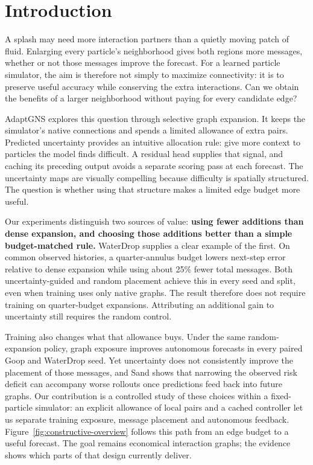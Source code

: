 \section{Introduction}
A splash may need more interaction partners than a quietly moving patch of fluid. Enlarging every particle's neighborhood gives both regions more messages, whether or not those messages improve the forecast. For a learned particle simulator\citep{sanchez2020}, the aim is therefore not simply to maximize connectivity: it is to preserve useful accuracy while conserving the extra interactions. Can we obtain the benefits of a larger neighborhood without paying for every candidate edge?

AdaptGNS explores this question through selective graph expansion. It keeps the simulator's native connections and spends a limited allowance of extra pairs. Predicted uncertainty provides an intuitive allocation rule: give more context to particles the model finds difficult. A residual head supplies that signal, and caching its preceding output avoids a separate scoring pass at each forecast. The uncertainty maps are visually compelling because difficulty is spatially structured. The question is whether using that structure makes a limited edge budget more useful.

Our experiments distinguish two sources of value: \textbf{using fewer additions than dense expansion, and choosing those additions better than a simple budget-matched rule.} WaterDrop supplies a clear example of the first. On common observed histories, a quarter-annulus budget lowers next-step error relative to dense expansion while using about 25\% fewer total messages. Both uncertainty-guided and random placement achieve this in every seed and split, even when training uses only native graphs. The result therefore does not require training on quarter-budget expansions. Attributing an additional gain to uncertainty still requires the random control.

Training also changes what that allowance buys. Under the same random-expansion policy, graph exposure improves autonomous forecasts in every paired Goop and WaterDrop seed. Yet uncertainty does not consistently improve the placement of those messages, and Sand shows that narrowing the observed risk deficit can accompany worse rollouts once predictions feed back into future graphs. Our contribution is a controlled study of these choices within a fixed-particle simulator: an explicit allowance of local pairs and a cached controller let us separate training exposure, message placement and autonomous feedback. Figure~\ref{fig:constructive-overview} follows this path from an edge budget to a useful forecast. The goal remains economical interaction graphs; the evidence shows which parts of that design currently deliver.

